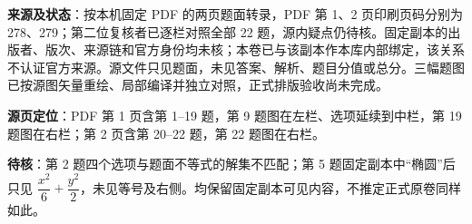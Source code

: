 

\begin{gktip}
\textbf{来源及状态}：按本机固定 PDF 的两页题面转录，PDF 第 1、2 页印刷页码分别为 278、279；第二位复核者已逐栏对照全部 22 题，源内疑点仍待核。固定副本的出版者、版次、来源链和官方身份均未核；本卷已与该副本作本库内部绑定，该关系不认证官方来源。源文件只见题面，未见答案、解析、题目分值或总分。三幅题图已按源图矢量重绘、局部编译并独立对照，正式排版验收尚未完成。

\textbf{源页定位}：PDF 第 1 页含第 1–19 题，第 9 题图在左栏、选项延续到中栏，第 19 题图在右栏；第 2 页含第 20–22 题，第 22 题图在右栏。

\textbf{待核}：第 2 题四个选项与题面不等式的解集不匹配；第 5 题固定副本中“椭圆”后只见 $\dfrac{x^2}{6}+\dfrac{y^2}{2}$，未见等号及右侧。均保留固定副本可见内容，不推定正式原卷同样如此。
\end{gktip}



